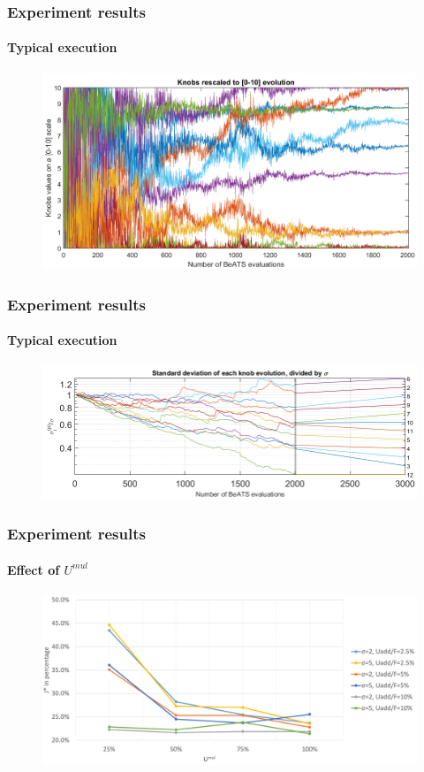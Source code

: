 \documentclass[fleqn]{beamer}
\begin{document}
\begin{frame}
	\frametitle{Experiment results}
	\framesubtitle{Typical execution}
	\begin{figure}
		\centering
		\includegraphics[width=4.5in]{figures/results_figures/typicalknobs.png}
	\end{figure}
\end{frame}

\begin{frame}
	\frametitle{Experiment results}
	\framesubtitle{Typical execution}
	\begin{figure}
		\centering
		\includegraphics[width=4.5in]{figures/results_figures/cmaesexample.png}
	\end{figure}
\end{frame}



\begin{frame}
	\frametitle{Experiment results}
	\framesubtitle{Effect of $U^{mul}$}
	\begin{figure}
		\centering
		\includegraphics[width=4.5in]{figures/umul.png}
	\end{figure}
\end{frame}
\end{document}
